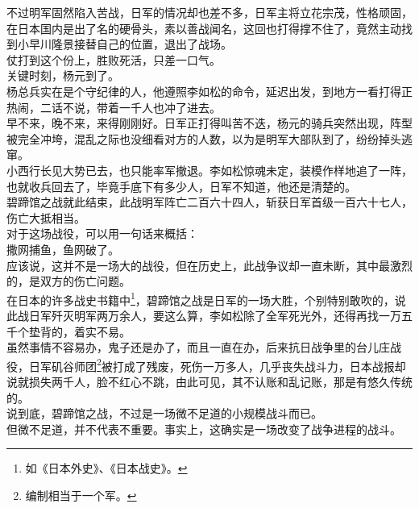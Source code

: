 \begin{multicols}{\theparacolNo}
不过明军固然陷入苦战，日军的情况却也差不多，日军主将立花宗茂，性格顽固，在日本国内是出了名的硬骨头，素以善战闻名，这回也打得撑不住了，竟然主动找到小早川隆景接替自己的位置，退出了战场。\\

仗打到这个份上，胜败死活，只差一口气。\\

关键时刻，杨元到了。\\

杨总兵实在是个守纪律的人，他遵照李如松的命令，延迟出发，到地方一看打得正热闹，二话不说，带着一千人也冲了进去。\\

早不来，晚不来，来得刚刚好。日军正打得叫苦不迭，杨元的骑兵突然出现，阵型被完全冲垮，混乱之际也没细看对方的人数，以为是明军大部队到了，纷纷掉头逃窜。\\

小西行长见大势已去，也只能率军撤退。李如松惊魂未定，装模作样地追了一阵，也就收兵回去了，毕竟手底下有多少人，日军不知道，他还是清楚的。\\

碧蹄馆之战就此结束，此战明军阵亡二百六十四人，斩获日军首级一百六十七人，伤亡大抵相当。\\

对于这场战役，可以用一句话来概括：\\

撒网捕鱼，鱼网破了。\\

应该说，这并不是一场大的战役，但在历史上，此战争议却一直未断，其中最激烈的，是双方的伤亡问题。\\

在日本的许多战史书籍中\footnote{如《日本外史》、《日本战史》。}，碧蹄馆之战是日军的一场大胜，个别特别敢吹的，说此战日军歼灭明军两万余人，要这么算，李如松除了全军死光外，还得再找一万五千个垫背的，着实不易。\\

虽然事情不容易办，鬼子还是办了，而且一直在办，后来抗日战争里的台儿庄战役，日军矶谷师团\footnote{编制相当于一个军。}被打成了残废，死伤一万多人，几乎丧失战斗力，日本战报却说就损失两千人，脸不红心不跳，由此可见，其不认账和乱记账，那是有悠久传统的。\\

说到底，碧蹄馆之战，不过是一场微不足道的小规模战斗而已。\\

但微不足道，并不代表不重要。事实上，这确实是一场改变了战争进程的战斗。\\


\end{multicols}
